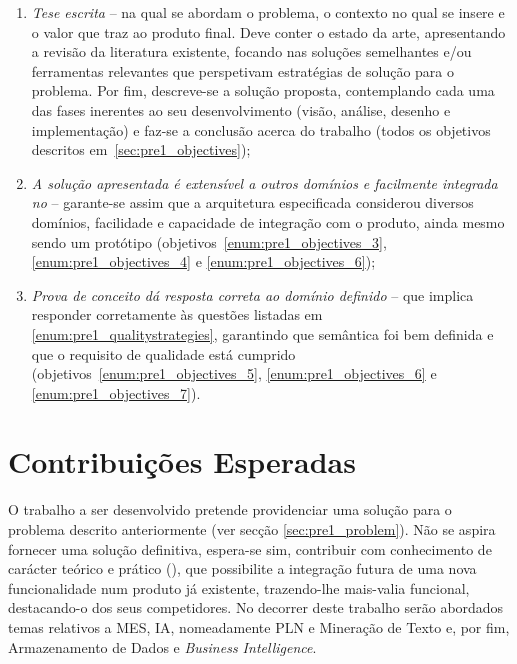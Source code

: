 \begin{enumerate}
    \item 
    {
        \textit{Tese escrita} -- na qual se abordam o problema, o contexto no qual se insere e o valor que traz ao produto final. Deve conter o estado da arte, apresentando a revisão da literatura existente, focando nas soluções semelhantes e/ou ferramentas relevantes que perspetivam estratégias de solução para o problema. Por fim, descreve-se a solução proposta, contemplando cada uma das fases inerentes ao seu desenvolvimento (visão, análise, desenho e implementação) e faz-se a conclusão acerca do trabalho (todos os objetivos descritos em~\ref{sec:pre1_objectives});
    }
    \item
    {
        \textit{A solução apresentada é extensível a outros domínios e facilmente integrada no {\productname}} -- garante-se assim que a arquitetura especificada considerou diversos domínios, facilidade e capacidade de integração com o produto, ainda mesmo sendo um protótipo (objetivos~\ref{enum:pre1_objectives_3}, \ref{enum:pre1_objectives_4} e \ref{enum:pre1_objectives_6});
    }
    \item
    {
        \textit{Prova de conceito dá resposta correta ao domínio definido} -- que implica responder corretamente às questões listadas em \ref{enum:pre1_qualitystrategies}, garantindo que semântica foi bem definida e que o requisito de qualidade está cumprido (objetivos~\ref{enum:pre1_objectives_5}, \ref{enum:pre1_objectives_6} e \ref{enum:pre1_objectives_7}).
    }
\end{enumerate}

\chapter{Contribuições Esperadas}
\label{chap:pre2}

O trabalho a ser desenvolvido pretende providenciar uma solução para o problema descrito anteriormente (ver secção \ref{sec:pre1_problem}). Não se aspira fornecer uma solução definitiva, espera-se sim, contribuir com conhecimento de carácter teórico e prático (), que possibilite a integração futura de uma nova funcionalidade num produto já existente, trazendo-lhe mais-valia funcional, destacando-o dos seus competidores. No decorrer deste trabalho serão abordados temas relativos a \gls{MES}, \gls{IA}, nomeadamente \gls{PLN} e Mineração de Texto e, por fim, Armazenamento de Dados e \textit{Business Intelligence}. 

